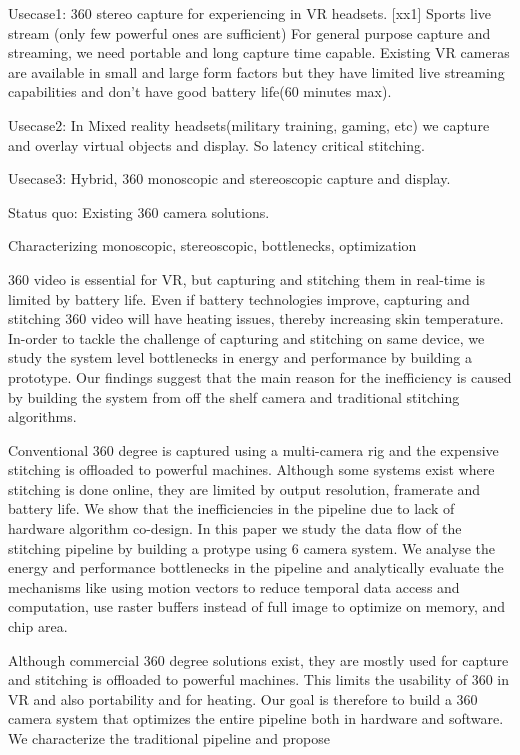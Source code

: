 Usecase1: 360 stereo capture for experiencing in VR headsets. 
[xx1] Sports live stream (only few powerful ones are sufficient)
For general purpose capture and streaming, we need portable and long capture time capable. Existing VR cameras are available in small and large form factors but they have limited live streaming capabilities and don't have good battery life(60 minutes max). 

Usecase2: In Mixed reality headsets(military training, gaming, etc) we capture and overlay virtual objects and display. So latency critical stitching. 

Usecase3: Hybrid, 360 monoscopic and stereoscopic capture and display.

Status quo:
Existing 360 camera solutions. \newline



Characterizing monoscopic, stereoscopic, bottlenecks, optimization


360 video is essential for VR, but capturing and stitching them in real-time is limited by battery life. Even if battery technologies improve, capturing and stitching 360 video will have heating issues, thereby increasing skin temperature. In-order to tackle the challenge of capturing and stitching on same device, we study the system level bottlenecks in energy and performance by building a prototype. Our findings suggest that the main reason for the inefficiency is caused by building the system from off the shelf camera and traditional stitching algorithms. 

Conventional 360 degree is captured using a multi-camera rig and the expensive stitching is offloaded to powerful machines. Although some systems exist where stitching is done online, they are limited by output resolution, framerate and battery life. We show that the inefficiencies in the pipeline due to lack of hardware algorithm co-design. In this paper we study the data flow of the stitching pipeline by building a protype using 6 camera system. We analyse the energy and performance bottlenecks in the pipeline and analytically evaluate the mechanisms like using motion vectors to reduce temporal data access and computation, use raster buffers instead of full image to optimize on memory, and chip area. 


Although commercial 360 degree solutions exist, they are mostly used for capture and stitching is offloaded to powerful machines. This limits the usability of 360 in VR and also portability and for heating. Our goal is therefore to build a 360 camera system that optimizes the entire pipeline both in hardware and software. We characterize the traditional pipeline and propose



